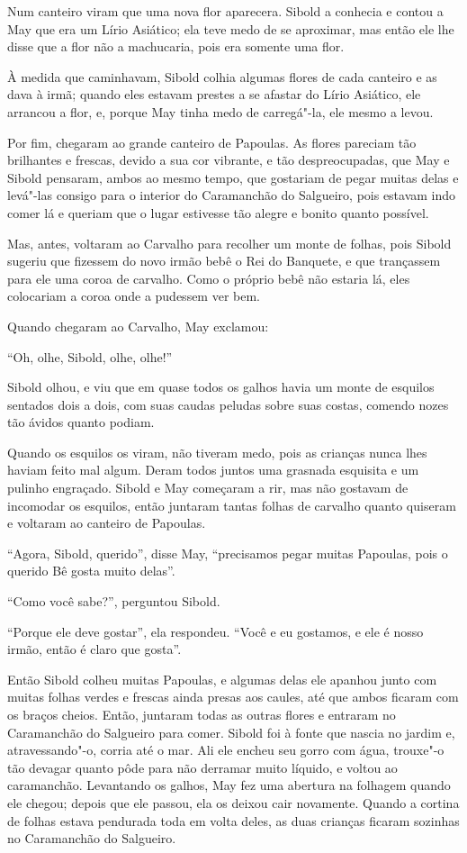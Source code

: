 Num canteiro viram que uma nova flor aparecera. Sibold a conhecia e
contou a May que era um Lírio Asiático; ela teve medo de se aproximar,
mas então ele lhe disse que a flor não a machucaria, pois era somente
uma flor.

À medida que caminhavam, Sibold colhia algumas flores de cada canteiro e
as dava à irmã; quando eles estavam prestes a se afastar do Lírio
Asiático, ele arrancou a flor, e, porque May tinha medo de carregá"-la,
ele mesmo a levou.

Por fim, chegaram ao grande canteiro de Papoulas. As flores pareciam tão
brilhantes e frescas, devido a sua cor vibrante, e tão despreocupadas,
que May e Sibold pensaram, ambos ao mesmo tempo, que gostariam de pegar
muitas delas e levá"-las consigo para o interior do Caramanchão do
Salgueiro, pois estavam indo comer lá e queriam que o lugar estivesse
tão alegre e bonito quanto possível.

Mas, antes, voltaram ao Carvalho para recolher um monte de folhas, pois
Sibold sugeriu que fizessem do novo irmão bebê o Rei do Banquete, e que
trançassem para ele uma coroa de carvalho. Como o próprio bebê não
estaria lá, eles colocariam a coroa onde a pudessem ver bem.

Quando chegaram ao Carvalho, May exclamou:

``Oh, olhe, Sibold, olhe, olhe!''

Sibold olhou, e viu que em quase todos os galhos havia um monte de
esquilos sentados dois a dois, com suas caudas peludas sobre suas
costas, comendo nozes tão ávidos quanto podiam.

Quando os esquilos os viram, não tiveram medo, pois as crianças nunca
lhes haviam feito mal algum. Deram todos juntos uma grasnada esquisita e
um pulinho engraçado. Sibold e May começaram a rir, mas não gostavam de
incomodar os esquilos, então juntaram tantas folhas de carvalho quanto
quiseram e voltaram ao canteiro de Papoulas.

``Agora, Sibold, querido'', disse May, ``precisamos pegar muitas
Papoulas, pois o querido Bê gosta muito delas''.

``Como você sabe?'', perguntou Sibold.

``Porque ele deve gostar'', ela respondeu. ``Você e eu gostamos, e ele é
nosso irmão, então é claro que gosta''.

Então Sibold colheu muitas Papoulas, e algumas delas ele apanhou junto
com muitas folhas verdes e frescas ainda presas aos caules, até que
ambos ficaram com os braços cheios. Então, juntaram todas as outras
flores e entraram no Caramanchão do Salgueiro para comer. Sibold foi à
fonte que nascia no jardim e, atravessando"-o, corria até o mar. Ali ele
encheu seu gorro com água, trouxe"-o tão devagar quanto pôde para não
derramar muito líquido, e voltou ao caramanchão. Levantando os galhos,
May fez uma abertura na folhagem quando ele chegou; depois que ele
passou, ela os deixou cair novamente. Quando a cortina de folhas estava
pendurada toda em volta deles, as duas crianças ficaram sozinhas no
Caramanchão do Salgueiro.

